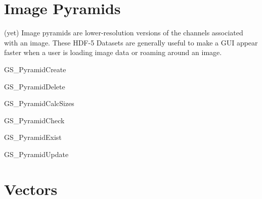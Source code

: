 \hypertarget{hdf_library_object_pyramids}{}\section{Image Pyramids}\label{hdf_library_object_pyramids}
(yet) Image pyramids are lower-\/resolution versions of the channels associated with an image. These H\+D\+F-\/5 Datasets are generally useful to make a G\+U\+I appear faster when a user is loading image data or roaming around an image. \begin{DoxyItemize}
\item G\+S\+\_\+\+Pyramid\+Create \item G\+S\+\_\+\+Pyramid\+Delete \item G\+S\+\_\+\+Pyramid\+Calc\+Sizes \item G\+S\+\_\+\+Pyramid\+Check \item G\+S\+\_\+\+Pyramid\+Exist \item G\+S\+\_\+\+Pyramid\+Update\end{DoxyItemize}
\hypertarget{hdf_library_object_vectors}{}\section{Vectors}\label{hdf_library_object_vectors}

